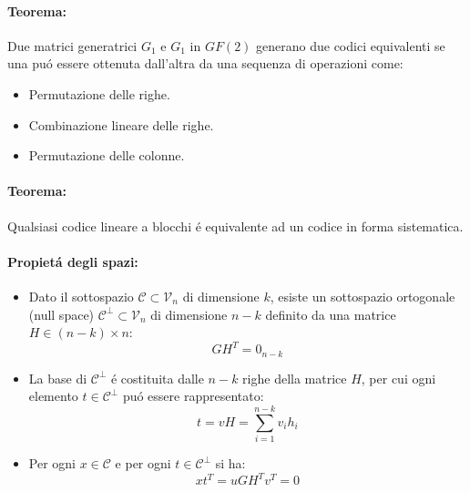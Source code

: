             \paragraph{Teorema:} Due matrici generatrici $G_1$ e $G_1$ in $GF(2)$ generano due codici equivalenti se una puó essere ottenuta dall'altra
            da una sequenza di operazioni come:
            \begin{itemize}
                \item Permutazione delle righe.
                \item Combinazione lineare delle righe.
                \item Permutazione delle colonne.
            \end{itemize}
            
            \paragraph{Teorema:} Qualsiasi codice lineare a blocchi é equivalente ad un codice in forma sistematica.

            \paragraph{Propietá degli spazi:}
            \begin{itemize}
                \item {
                    Dato il sottospazio $\mathcal{C} \subset \mathcal{V}_n$ di dimensione $k$, esiste un sottospazio ortogonale (null space)
                    $\mathcal{C}^\perp \subset \mathcal{V}_n$ di dimensione $n-k$ definito da una matrice $H\in (n-k) \times n$:
                    \[
                        GH^T = 0_{n-k}  
                    \]
                }
                \item {
                    La base di $\mathcal{C}^\perp$ é costituita dalle $n-k$ righe della matrice $H$, per cui ogni elemento $t\in \mathcal{C}^\perp$ puó 
                    essere rappresentato:
                    \[
                        t = vH = \sum_{i=1}^{n-k}v_ih_i  
                    \]
                }
                \item {
                    Per ogni $x\in \mathcal{C}$ e per ogni $t\in \mathcal{C}^\perp$ si ha:
                    \[
                        xt^T = uGH^Tv^T = 0
                    \]  
                }
            \end{itemize}
